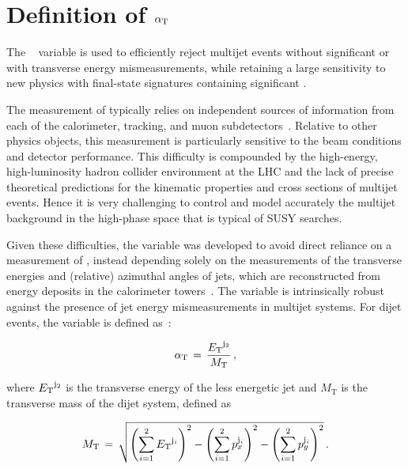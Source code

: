 \section{Definition of $\alpha_{\text{T}}$}
\label{sec:alphatdef}

The \alphat~\cite{Randall:2008rw, RA1Paper} variable is used to
efficiently reject multijet events without significant \met or with
transverse energy mismeasurements, while retaining a large sensitivity
to new physics with final-state signatures containing significant
\met.

The measurement of \met typically relies on independent sources of
information from each of the calorimeter, tracking, and muon
subdetectors~\cite{cms-met}. Relative to other physics objects, this
measurement is particularly sensitive to the beam conditions and
detector performance. This difficulty is compounded by the
high-energy, high-luminosity hadron collider environment at the LHC
and the lack of precise theoretical predictions for the kinematic
properties and cross sections of multijet events. Hence it is very
challenging to control and model accurately the multijet background in
the high-\met phase space that is typical of SUSY searches.

Given these difficulties, the variable \alphat was developed to avoid
direct reliance on a measurement of \met, instead depending solely on
the measurements of the transverse energies and (relative) azimuthal
angles of jets, which are reconstructed from energy deposits in the
calorimeter towers~\cite{Chatrchyan:2011ds}.  The variable is
intrinsically robust against the presence of jet energy
mismeasurements in multijet systems.
For dijet events, the \alphat variable is defined
as~\cite{Randall:2008rw, RA1Paper}:

\begin{equation}
\label{eq:alphat}
\alpha_{\text{T}}\, =\, \frac{{E_{\text T}}^{{\rm j}_2}}{M_\text{T}} \, ,
\end{equation}

where ${E_{\text T}}^{\rm j_2}$ is the transverse energy of the less energetic
jet and $M_\text{T}$ is the transverse mass of the dijet system,
defined as

\begin{equation}
  \label{eq:mt}
  M_\text{T}\, = \,\sqrt{ \left( \sum_{i=1}^2 {E_{\text T}}^{{\rm j}_i}
    \right)^2 - \left( \sum_{i=1}^2 p_x^{{\rm j}_i} \right)^2 - \left(
      \sum_{i=1}^2 p_y^{{\rm j}_i} \right)^2} \, .
\end{equation}

